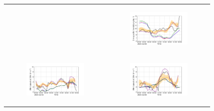 \begin{figure}[hbtp]
\begin{tabular}{cc}
\begin{subfigure}[t]{0.5\textwidth}
        \end{subfigure} &
        \begin{subfigure}[t]{0.5\textwidth}
            \caption{}
            \includegraphics[width=\textwidth]{images/chap6/IOP_TS/TS_2021-07-20_elsplans_q2m.png}
        \end{subfigure} \\
        \begin{subfigure}[t]{0.5\textwidth}
            \caption{}
            \includegraphics[width=\textwidth]{images/chap6/IOP_TS/TS_2021-07-15_elsplans_wind_speed_10m.png}
        \end{subfigure} &
        \begin{subfigure}[t]{0.5\textwidth}
            \caption{}
            \includegraphics[width=\textwidth]{images/chap6/IOP_TS/TS_2021-07-20_elsplans_wind_speed_10m.png}

\end{subfigure}
\end{tabular}
\end{figure}
